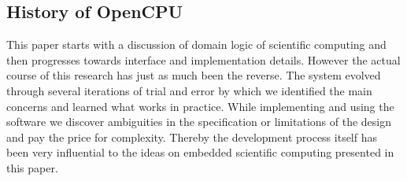 \subsection{History of OpenCPU}

This paper starts with a discussion of domain logic of scientific computing and then progresses towards interface and implementation details. However the actual course of this research has just as much been the reverse. The \OpenCPU system evolved through several iterations of trial and error by which we identified the main concerns and learned what works in practice. While implementing and using the software we discover ambiguities in the specification or limitations of the design and pay the price for complexity. Thereby the development process itself has been very influential to the ideas on embedded scientific computing presented in this paper. 


